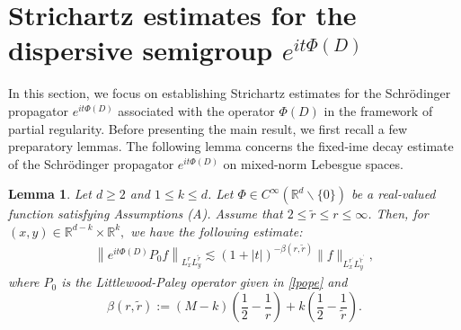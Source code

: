 \documentclass[a4paper,11pt, reqno]{amsart}
\newtheorem{lem}[theorem]{Lemma}
\theoremstyle{definition}
\theoremstyle{remark}
\numberwithin{equation}{section}
\begin{document}
		\section{Strichartz estimates for the dispersive semigroup $e^{it\Phi(D)}$} \label{sec3} 
	In this section, we focus on establishing Strichartz estimates for the Schrödinger propagator $e^{it\Phi(D)}$ associated with the operator $\Phi(D)$ in the framework of partial regularity. Before presenting the main result, we first recall a few preparatory lemmas. The following lemma concerns the fixed-ime decay estimate of the Schrödinger propagator $e^{it\Phi(D)}$ on mixed-norm Lebesgue spaces.
	\begin{lem}\label{eq6}
		Let $d \geq 2 $ and $1 \leq k \leq d$.  Let $\Phi \in C^{\infty}\left(\mathbb{R}^{d} \backslash\{0\}\right)$ be a real-valued function satisfying Assumptions (A).  Assume that $2 \leq \widetilde{r} \leq r \leq \infty$. Then, for $(x, y) \in \mathbb{R}^{d-k} \times \mathbb{R}^k,$ we have the following estimate:
		\begin{align}\label{eq5}
			\left\|e^{i t\Phi(D)} P_0 f\right\|_{L_x^r L_y^{\tilde{r}}} \lesssim(1+|t|)^{-\beta(r, \widetilde{r})}\|f\|_{L_x^{r^{\prime}} L_y^{\tilde{r}^{\prime}}}, 
		\end{align}
		where $P_0$ is the Littlewood-Paley operator given in \eqref{lpope} and $$\beta(r, \widetilde{r}):=(M-k)\left(\frac{1}{2}-\frac{1}{r}\right)+k\left(\frac{1}{2}-\frac{1}{\widetilde{r}}\right).$$
	\end{lem} 
\end{document}
